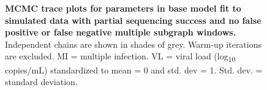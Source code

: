 \documentclass[10pt,letterpaper]{article}
\begin{document}
\begin{figure}[!ht]
\caption{{\bf MCMC trace plots for parameters in base model fit to simulated data with partial sequencing success and no false positive or false negative multiple subgraph windows.} Independent chains are shown in shades of grey. Warm-up iterations are excluded. MI = multiple infection. VL = viral load (log\textsubscript{10} copies/mL) standardized to mean = 0 and std. dev = 1. Std. dev. = standard deviation.}
\end{figure}
\end{document}
